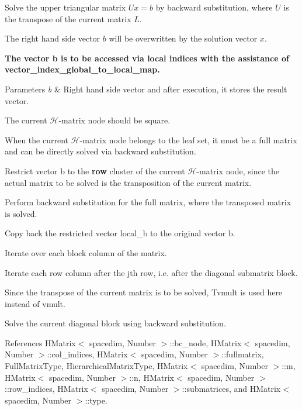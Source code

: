 Solve the upper triangular matrix $Ux=b$ by backward substitution, where $U$ is the transpose of the current matrix $L$.

The right hand side vector $b$ will be overwritten by the solution vector $x$.

{\bfseries The vector {\ttfamily b} is to be accessed via local indices with the assistance of {\ttfamily vector\+\_\+index\+\_\+global\+\_\+to\+\_\+local\+\_\+map}.}


\begin{DoxyParams}{Parameters}
{\em b} & Right hand side vector and after execution, it stores the result vector. \\
\hline
\end{DoxyParams}
The current $\mathcal{H}$-\/matrix node should be square.

When the current $\mathcal{H}$-\/matrix node belongs to the leaf set, it must be a full matrix and can be directly solved via backward substitution.

Restrict vector {\ttfamily b} to the {\bfseries row} cluster of the current $\mathcal{H}$-\/matrix node, since the actual matrix to be solved is the transposition of the current matrix.

Perform backward substitution for the full matrix, where the transposed matrix is solved.

Copy back the restricted vector {\ttfamily local\+\_\+b} to the original vector {\ttfamily b}.

Iterate over each block column of the matrix.

Iterate each row column after the j\textquotesingle{}th row, i.\+e. after the diagonal submatrix block.

Since the transpose of the current matrix is to be solved, {\ttfamily Tvmult} is used here instead of {\ttfamily vmult}.

Solve the current diagonal block using backward substitution.

References H\+Matrix$<$ spacedim, Number $>$\+::bc\+\_\+node, H\+Matrix$<$ spacedim, Number $>$\+::col\+\_\+indices, H\+Matrix$<$ spacedim, Number $>$\+::fullmatrix, Full\+Matrix\+Type, Hierarchical\+Matrix\+Type, H\+Matrix$<$ spacedim, Number $>$\+::m, H\+Matrix$<$ spacedim, Number $>$\+::n, H\+Matrix$<$ spacedim, Number $>$\+::row\+\_\+indices, H\+Matrix$<$ spacedim, Number $>$\+::submatrices, and H\+Matrix$<$ spacedim, Number $>$\+::type.

\mbox{\label{classHMatrix_a8dcb361dfb254ff716755ba8b7ed9cf1}} 
